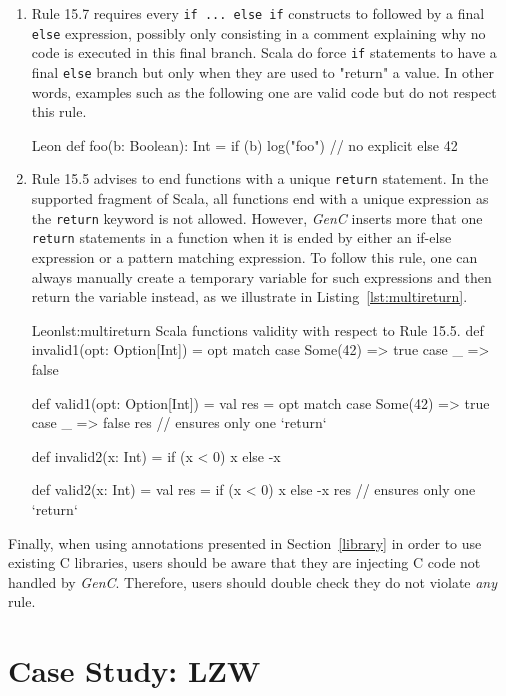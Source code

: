 \documentclass[a4paper,twoside]{article}
\newcommand{\InlineC}[1]{\lstinline[language=C99]|#1|}
\newcommand{\InlineS}[1]{\lstinline[language=Leon]|#1|}
\let\oldsection\section
\renewcommand\section{\cleardoublepage\oldsection}
\newcommand{\GenC}{\emph{GenC}\xspace}
\newcommand{\RefSec}[1]{Section~\ref{#1}}
\newcommand{\RefCode}[1]{Listing~\ref{#1}}
\begin{document}
\begin{enumerate}
\item Rule 15.7 requires every \InlineC{if ... else if} constructs to followed
by a final \InlineC{else} expression, possibly only consisting in a comment
explaining why no code is executed in this final branch. Scala do force
\InlineS{if} statements to have a final \InlineS{else} branch but only when they
are used to "return" a value. In other words, examples such as the following one
are valid code but do not respect this rule.

\begin{ShortCode}{Leon}
def foo(b: Boolean): Int = {
  if (b) log("foo") // no explicit else
  42
}
\end{ShortCode}

\item Rule 15.5 advises to end functions with a unique \InlineC{return}
statement. In the supported fragment of Scala, all functions end with a unique
expression as the \InlineS{return} keyword is not allowed. However, \GenC
inserts more that one \InlineC{return} statements in a function when it is ended
by either an if-else expression or a pattern matching expression. To follow this
rule, one can always manually create a temporary variable for such expressions
and then return the variable instead, as we illustrate in
\RefCode{lst:multireturn}.

\begin{Code}{Leon}{lst:multireturn}{%
Scala functions validity with respect to Rule 15.5.}
def invalid1(opt: Option[Int]) = opt match {
  case Some(42) => true
  case _        => false
}

def valid1(opt: Option[Int]) = {
  val res = opt match {
    case Some(42) => true
    case _        => false
  }
  res // ensures only one `return`
}

def invalid2(x: Int) = if (x < 0) x else -x

def valid2(x: Int) = {
  val res = if (x < 0) x else -x
  res // ensures only one `return`
}
\end{Code}

\end{enumerate}

Finally, when using annotations presented in \RefSec{library} in order to use
existing C libraries, users should be aware that they are injecting C code not
handled by \GenC. Therefore, users should double check they do not violate
\emph{any} rule.

\section{Case Study: LZW}
\label{lzw}
\end{document}
